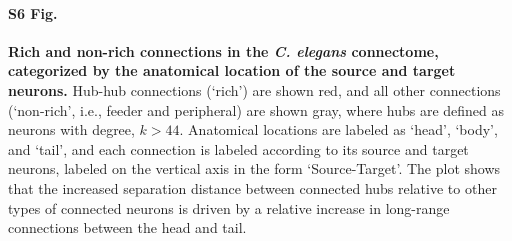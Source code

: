 \documentclass[10pt,letterpaper]{article}
\begin{document}

\paragraph*{S6 Fig.}
\label{S6_Fig}
{\bf Rich and non-rich connections in the \emph{C. elegans} connectome, categorized by the  anatomical location of the source and target neurons.}
   Hub-hub connections (`rich') are shown red, and all other connections (`non-rich', i.e., feeder and peripheral) are shown gray, where hubs are defined as neurons with degree, $k > 44$.
Anatomical locations are labeled as `head', `body', and `tail', and each connection is labeled according to its source and target neurons, labeled on the vertical axis in the form `Source-Target'.
The plot shows that the increased separation distance between connected hubs relative to other types of connected neurons is driven by a relative increase in long-range connections between the head and tail.

\end{document}
